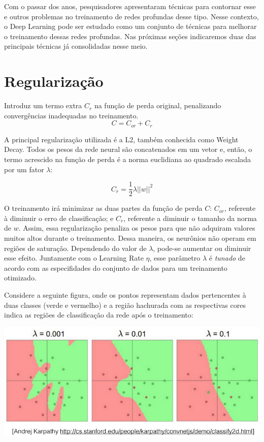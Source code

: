\documentclass[
	12pt,				%
	oneside,			%
	a4paper,			%
	english,			%
	french,				%
	spanish,			%
	brazil,				%
	]{abntex2}
\begin{document}
Com o passar dos anos, pesquisadores apresentaram técnicas para contornar esse e outros problemas no treinamento de redes profundas desse tipo. Nesse contexto, o Deep Learning pode ser estudado como um conjunto de técnicas para melhorar o treinamento dessas redes profundas. Nas próximas seções indicaremos duas das principais técnicas já consolidadas nesse meio.

\section{Regularização}
Introduz um termo extra $C_r$ na função de perda original, penalizando convergências inadequadas no treinamento.
$$ C = C_{or} + C_r$$

A principal regularização utilizada é a L2, também conhecida como Weight Decay. Todos os pesos da rede neural são concatenados em um vetor e, então, o termo acrescido na função de perda é a norma euclidiana ao quadrado escalada por um fator $\lambda$:

$$ C_r = \frac{1}{2} \lambda || w ||^2 $$

O treinamento irá minimizar as duas partes da função de perda $C$: $C_{or}$, referente à diminuir o erro de classificação; e $C_r$, referente a diminuir o tamanho da norma de $w$. Assim, essa regularização penaliza os pesos para que não adquiram valores muitos altos durante o treinamento. Dessa maneira, os neurônios não operam em regiões de saturação. Dependendo do valor de $\lambda$, pode-se aumentar ou diminuir esse efeito. Juntamente com o Learning Rate $\eta$, esse parâmetro $\lambda$ é \textit{tunado} de acordo com as especifidades do conjunto de dados para um treinamento otimizado.

Considere a seguinte figura, onde os pontos representam dados pertencentes à duas classes (verde e vermelho) e a região hachurada com as respectivas cores indica as regiões de classificação da rede após o treinamento:

\begin{center}
	\includegraphics[scale=0.8]{regL2.png}
\end{center}
\end{document}
